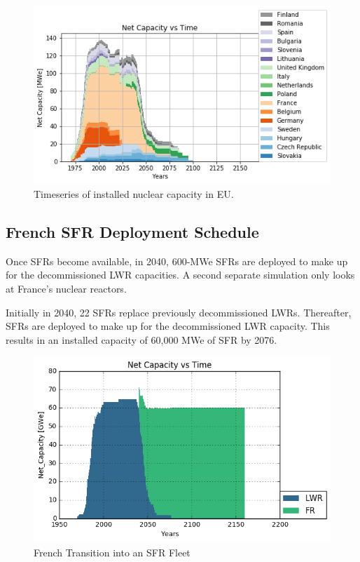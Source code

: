 \begin{figure}[htbp!]
	\begin{center}
		\includegraphics[scale=0.7]{./images/eu_future/power_plot.png}
	\end{center}
	\caption{Timeseries of installed nuclear capacity in \gls{EU}.}
	\label{fig:eu_pow}
\end{figure}
\FloatBarrier

\subsection{French \gls{SFR} Deployment Schedule}

Once \glspl{SFR} become available, in 2040,
600-MWe \glspl{SFR} are deployed to make up for the 
decommissioned \gls{LWR} capacities. A second
separate simulation only looks at France's nuclear reactors.

Initially in 2040, 22 \gls{SFR}s
replace previously decommissioned
\gls{LWR}s. Thereafter, \glspl{SFR} are deployed to
make up for the decommissioned \gls{LWR} capacity.
This results in an installed capacity of 60,000 MWe
of \gls{SFR} by 2076.

\begin{figure}[htbp!]
        \begin{center}
                \includegraphics[scale=0.7]{./images/french-transition/number_plot.png}
        \end{center}
        \caption{French Transition into an SFR Fleet}
        \label{fig:sfr_num}
\end{figure}
\FloatBarrier


